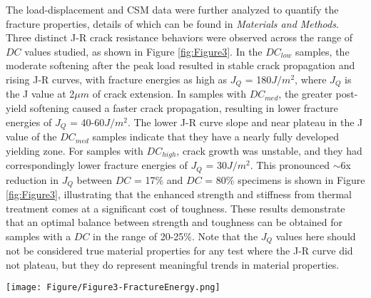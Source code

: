 \documentclass[11pt]{article}
\providecommand{\Jms}[0]{$J/m^2$}
\providecommand{\um}[0]{$\mu m$}
\providecommand{\DC}[0]{$DC$}
\providecommand{\DClow}[0]{$DC_{low}$}
\providecommand{\DCmed}[0]{$DC_{med}$}
\providecommand{\DChi}[0]{$DC_{high}$}
\providecommand{\Jq}[0]{$J_{Q}$}
\begin{document}
        The load-displacement and CSM data were further analyzed to quantify the fracture properties, details of which can be found in \textit{Materials and Methods}.
        Three distinct J-R crack resistance behaviors were observed across the range of \DC{} values studied, as shown in Figure \ref{fig:Figure3}. 
        In the \DClow{} samples, the moderate softening after the peak load resulted in stable crack propagation and rising J-R curves, with fracture energies as high as \Jq{} = 180\Jms{}, where \Jq{} is the J value at 2\um{} of crack extension.
        In samples with \DCmed{}, the greater post-yield softening caused a faster crack propagation, resulting in lower fracture energies of \Jq{} = 40-60\Jms{}.
        The lower J-R curve slope and near plateau in the J value of the \DCmed{} samples indicate that they have a nearly fully developed yielding zone.
        For samples with \DChi{}, crack growth was unstable, and they had correspondingly lower fracture energies of \Jq{} = 30\Jms{}.
        This pronounced $\sim$6x reduction in \Jq{} between \DC{} = 17\% and \DC{} = 80\% specimens is shown in Figure \ref{fig:Figure3}, illustrating that the enhanced strength and stiffness from thermal treatment comes at a significant cost of toughness.
        These results demonstrate that an optimal balance between strength and toughness can be obtained for samples with a \DC{} in the range of 20-25\%.
        Note that the \Jq{} values here should not be considered true material properties for any test where the J-R curve did not plateau, but they do represent meaningful trends in material properties.
        
        \begin{figure*}[ht!]
                \texttt{[image: Figure/Figure3-FractureEnergy.png]} 
                \caption{\textbf{J-R curves, Fracture Energy and Bending Stiffness:} 
                A) Representative J-R curves showing decreasing crack growth resistance with increasing \DC{}. 
                Insets show plastic zone sizes of respective materials. 
                B) Fracture Energy (hollow markers) and bending stiffness (solid markers) vs \DC{} for all samples tested in this study, showing decreasing fracture energy and changing fracture behavior with increasing sample stiffness. 
                Error bars represent standard deviation values from at least three runs on each specimen type.}
                \label{fig:Figure3} 
        \end{figure*}
\end{document}
